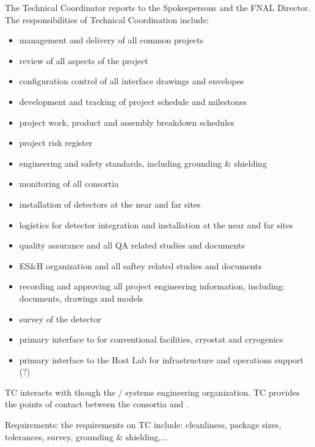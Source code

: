 The  Technical Coordinator reports to the 
Spokespersons and the FNAL Director. The responsibilities of Technical
Coordination include:
\begin{itemize}
  \item management and delivery of all common projects
  \item review of all aspects of the project
  \item configuration control of all interface drawings and envelopes
  \item development and tracking of project schedule and milestones
  \item project work, product and assembly breakdown schedules
  \item project risk register
  \item {} engineering and safety standards, including grounding \& shielding
  \item monitoring of all consortia
  \item installation of detectors at the near and far sites
  \item logistics for detector integration and installation at the near and far sites
  \item quality assurance and all QA related studies and documents
  \item ES\&H organization and all saftey related studies and documents
  \item recording and approving all project engineering information, including: documents, drawings and models
  \item survey of the detector
  \item primary interface to  for conventional facilities, cryostat and cryogenics
  \item primary interface to the Host Lab for infrastructure and operations support (?)
\end {itemize}

 TC interacts with  though the
/ systems engineering organization. TC
provides the points of contact between the consortia and .

Requirements: the requirements on TC include: cleanliness, package
sizes, tolerances, survey, grounding \& shielding,...





